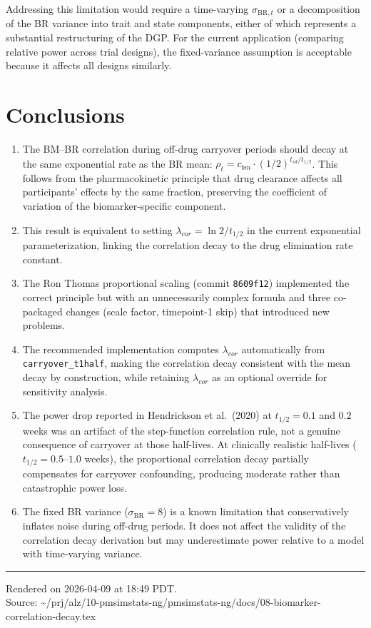 \documentclass[11pt]{article}
\begin{document}
Addressing this limitation would require a time-varying
$\sigma_{\text{BR},t}$ or a decomposition of the BR
variance into trait and state components, either of which
represents a substantial restructuring of the DGP. For the
current application (comparing relative power across trial
designs), the fixed-variance assumption is acceptable
because it affects all designs similarly.

\section{Conclusions}

\begin{enumerate}
\item The BM--BR correlation during off-drug carryover
  periods should decay at the same exponential rate as the
  BR mean: $\rho_t = c_{bm} \cdot (1/2)^{t_{sd}/t_{1/2}}$.
  This follows from the pharmacokinetic principle that drug
  clearance affects all participants' effects by the same
  fraction, preserving the coefficient of variation of the
  biomarker-specific component.

\item This result is equivalent to setting
  $\lambda_{cor} = \ln 2 / t_{1/2}$ in the current
  exponential parameterization, linking the correlation
  decay to the drug elimination rate constant.

\item The Ron Thomas proportional scaling (commit
  \texttt{8609f12}) implemented the correct principle but
  with an unnecessarily complex formula and three
  co-packaged changes (scale factor, timepoint-1 skip)
  that introduced new problems.

\item The recommended implementation computes
  $\lambda_{cor}$ automatically from
  \texttt{carryover\_t1half}, making the correlation decay
  consistent with the mean decay by construction, while
  retaining $\lambda_{cor}$ as an optional override for
  sensitivity analysis.

\item The power drop reported in Hendrickson et al.\ (2020)
  at $t_{1/2} = 0.1$ and $0.2$ weeks was an artifact of the
  step-function correlation rule, not a genuine consequence
  of carryover at those half-lives. At clinically realistic
  half-lives ($t_{1/2} = 0.5$--$1.0$ weeks), the
  proportional correlation decay partially compensates for
  carryover confounding, producing moderate rather than
  catastrophic power loss.

\item The fixed BR variance ($\sigma_{\text{BR}} = 8$) is a
  known limitation that conservatively inflates noise during
  off-drug periods. It does not affect the validity of the
  correlation decay derivation but may underestimate power
  relative to a model with time-varying variance.
\end{enumerate}

\vfill
\noindent\rule{\textwidth}{0.4pt}
{\footnotesize
Rendered on 2026-04-09 at 18:49 PDT.\\
Source: \textasciitilde/prj/alz/10-pmsimstats-ng/pmsimstats-ng/docs/08-biomarker-correlation-decay.tex}
\end{document}

